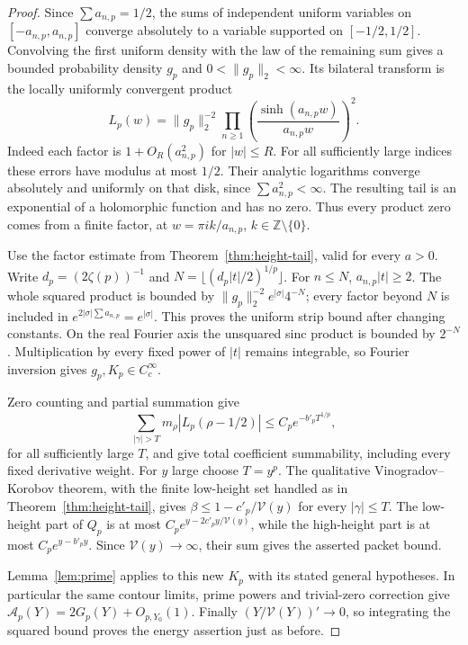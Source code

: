 \documentclass[11pt]{article}
\theoremstyle{remark}\newtheorem{remark}[theorem]{Remark}
\newcommand{\Z}{\mathbb Z}
\begin{document}
\begin{proof}
Since $\sum a_{n,p}=1/2$, the sums of independent uniform
variables on $[-a_{n,p},a_{n,p}]$ converge absolutely to
a variable supported on $[-1/2,1/2]$. Convolving the first
uniform density with the law of the remaining sum gives a
bounded probability density $g_p$ and $0<\|g_p\|_2<\infty$.
Its bilateral transform is the locally uniformly convergent product
\[
 L_p(w)=\|g_p\|_2^{-2}
      \prod_{n\ge1}\left(\frac{\sinh(a_{n,p}w)}{a_{n,p}w}\right)^2.
\]
Indeed each factor is $1+O_R(a_{n,p}^2)$ for $|w|\le R$.
For all sufficiently large indices these errors have modulus
at most $1/2$. Their analytic logarithms converge absolutely
and uniformly on that disk, since $\sum a_{n,p}^2<\infty$.
The resulting tail is an exponential of a holomorphic function
and has no zero. Thus every product zero comes from a finite
factor, at $w=\pi i k/a_{n,p}$, $k\in\Z\setminus\{0\}$.

Use the factor estimate from Theorem~\ref{thm:height-tail},
valid for every $a>0$. Write $d_p=(2\zeta(p))^{-1}$ and
$N=\lfloor(d_p|t|/2)^{1/p}\rfloor$. For $n\le N$,
$a_{n,p}|t|\ge2$. The whole squared product is bounded by
$\|g_p\|_2^{-2}e^{|\sigma|}4^{-N}$; every factor beyond $N$
is included in $e^{2|\sigma|\sum a_{n,p}}=e^{|\sigma|}$.
This proves the uniform strip bound after changing constants.
On the real Fourier axis the unsquared sinc product is bounded
by $2^{-N}$. Multiplication by every fixed power of $|t|$
remains integrable, so Fourier inversion gives
$g_p,K_p\in C_c^\infty$.

Zero counting and partial summation give
\[
 \sum_{|\gamma|>T}m_\rho|L_p(\rho-1/2)|
        \le C_p e^{-b'_pT^{1/p}},
\]
for all sufficiently large $T$, and give total coefficient
summability, including every fixed derivative weight.
For $y$ large choose $T=y^p$. The qualitative
Vinogradov--Korobov theorem, with the finite low-height
set handled as in Theorem~\ref{thm:height-tail}, gives
$\beta\le1-c'_p/\mathcal V(y)$ for every $|\gamma|\le T$.
The low-height part of $Q_p$ is at most
$C_pe^{y-2c'_py/\mathcal V(y)}$, while the high-height part
is at most $C_pe^{y-b'_py}$. Since $\mathcal V(y)\to\infty$,
their sum gives the asserted packet bound.

Lemma~\ref{lem:prime} applies to this new $K_p$ with its
stated general hypotheses. In particular the same contour
limits, prime powers and trivial-zero correction give
$\mathcal A_p(Y)=2G_p(Y)+O_{p,Y_0}(1)$.
Finally $(Y/\mathcal V(Y))'\to0$, so integrating the
squared bound proves the energy assertion just as before.
\end{proof}
\end{document}
